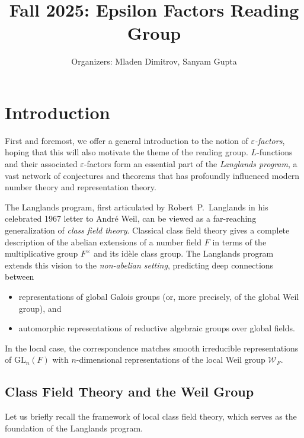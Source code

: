 \documentclass[11pt]{amsart}
\title{Fall 2025: Epsilon Factors Reading Group}
\author{Organizers: Mladen Dimitrov, Sanyam Gupta}
\begin{document}
\maketitle
\tableofcontents

\section{Introduction}
First and foremost, we offer a general introduction to the notion of
\emph{$\varepsilon$-factors}, hoping that this will also motivate the theme of the
reading group.  $L$-functions and their associated $\varepsilon$-factors form an
essential part of the \emph{Langlands program}, a vast network of conjectures
and theorems that has profoundly influenced modern number theory and
representation theory.

The Langlands program, first articulated by Robert~P.\ Langlands in his
celebrated 1967 letter to André Weil, can be viewed as a far-reaching
generalization of \emph{class field theory}.  Classical class field theory
gives a complete description of the abelian extensions of a number field
$F$ in terms of the multiplicative group $F^\times$ and its idèle class
group.  The Langlands program extends this vision to the
\emph{non-abelian setting}, predicting deep connections between
\begin{itemize}
    \item representations of global Galois groups (or, more precisely,
          of the global Weil group), and
    \item automorphic representations of reductive algebraic groups over
          global fields.
\end{itemize}

In the local case, the correspondence matches smooth irreducible
representations of $\mathrm{GL}_n(F)$ with $n$-dimensional representations of
the local Weil group $\mathcal W_F$.

\bigskip

\subsection{Class Field Theory and the Weil Group}

Let us briefly recall the framework of local class field theory, which serves as 
the foundation of the Langlands program.
\end{document}
